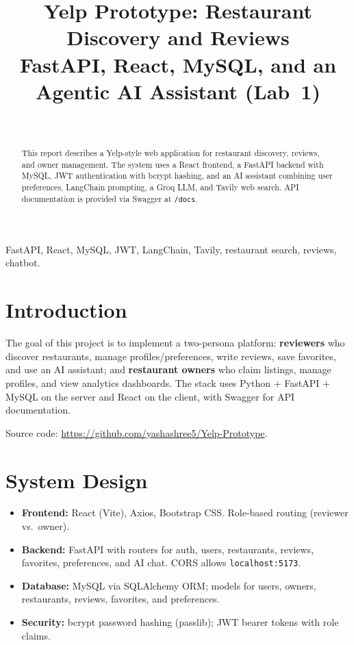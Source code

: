 \documentclass[onecolumn,journal]{IEEEtran}
\begin{document}
\title{Yelp Prototype: Restaurant Discovery and Reviews\\
{\large FastAPI, React, MySQL, and an Agentic AI Assistant (Lab~1)}}

\author{%
\\[0.5em]
}

\maketitle

\begin{abstract}
This report describes a Yelp-style web application for restaurant discovery, reviews, and owner management. The system uses a React frontend, a FastAPI backend with MySQL, JWT authentication with bcrypt hashing, and an AI assistant combining user preferences, LangChain prompting, a Groq LLM, and Tavily web search. API documentation is provided via Swagger at \texttt{/docs}.
\end{abstract}

\begin{IEEEkeywords}
FastAPI, React, MySQL, JWT, LangChain, Tavily, restaurant search, reviews, chatbot.
\end{IEEEkeywords}

\section{Introduction}

The goal of this project is to implement a two-persona platform: \textbf{reviewers} who discover restaurants, manage profiles/preferences, write reviews, save favorites, and use an AI assistant; and \textbf{restaurant owners} who claim listings, manage profiles, and view analytics dashboards. The stack uses Python + FastAPI + MySQL on the server and React on the client, with Swagger for API documentation.

Source code: \url{https://github.com/yashashree5/Yelp-Prototype}.

\section{System Design}
\label{sec:design}

\begin{itemize}
  \item \textbf{Frontend:} React (Vite), Axios, Bootstrap CSS. Role-based routing (reviewer vs.\ owner).
  \item \textbf{Backend:} FastAPI with routers for auth, users, restaurants, reviews, favorites, preferences, and AI chat. CORS allows \texttt{localhost:5173}.
  \item \textbf{Database:} MySQL via SQLAlchemy ORM; models for users, owners, restaurants, reviews, favorites, and preferences.
  \item \textbf{Security:} bcrypt password hashing (passlib); JWT bearer tokens with role claims.
\end{itemize}
\end{document}
